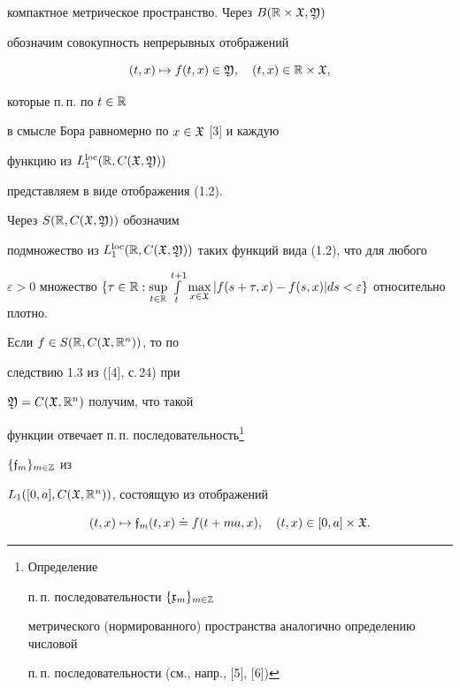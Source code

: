 компактное метрическое пространство. Через $B(\Bbb R\times\frak X,\frak Y)$


обозначим совокупность непрерывных отображений


\begin{equation}


(t,x)\mapsto f(t,x)\in\frak Y,\quad (t,x)\in\Bbb R\times\frak X,


\end{equation}


которые п.\,п. по $t\in\Bbb R$


в смысле Бора равномерно по $x\in\frak X$ [3] и каждую


функцию из $L_1^{\operatorname{loc}}(\Bbb R,C(\frak X,\frak Y))$


представляем в виде отображения (1.2).


Через $S(\Bbb R,C(\frak X,{\frak Y}))$ обозначим


подмножество из $L_1^{\loc}(\Bbb R,C(\frak X,


\frak Y))$ таких функций вида (1.2), что для любого


$\varepsilon>0$ множество $\{\tau\in{\Bbb


R}:\sup\limits_{t\in\Bbb R}\int\limits_t^{t+1}


\max\limits_{x\in\frak X}|f(s+\tau,x)-


f(s,x)|ds<\varepsilon\}$ относительно плотно.





Если $f\in S(\Bbb R,C(\frak X,\Bbb R^n))$, то по


следствию 1.3 из ([4], с.\,24) при


${\frak Y}=C(\frak X,\Bbb R^n)$ получим, что такой


функции отвечает п.\,п. последовательность\footnote{Определение


п.\,п. последовательности $\{\frak x_m\}_{m\in\Bbb Z}$


метрического (нормированного) пространства аналогично определению числовой


п.\,п. последовательности (см., напр., [5], [6])}


$\{\frak f_m\}_{m\in\Bbb Z}$ из


$L_1([0,a],C(\frak X,\Bbb R^n))$, состоящую из отображений


\begin{equation}


(t,x)\mapsto {{\frak f}}_m(t,x)\doteq f(t+ma,x),\quad


(t,x)\in[0,a]\times\frak X.


\end{equation}





